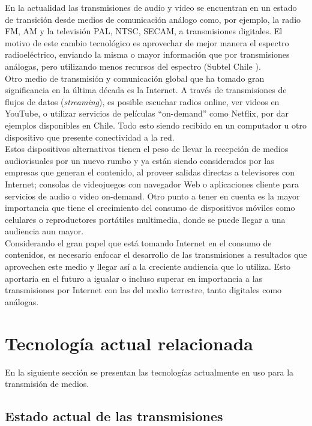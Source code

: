 En la actualidad las transmisiones de audio y video se encuentran en un estado de transición desde medios de comunicación análogo como, por ejemplo, la radio FM, AM y la televisión PAL, NTSC, SECAM, a transmisiones digitales. El motivo de este cambio tecnológico es aprovechar de mejor manera el espectro radioeléctrico, enviando la misma o mayor información que por transmisiones análogas, pero utilizando menos recursos del espectro (Subtel Chile \cite{sota:subtel}).\\

Otro medio de transmisión y comunicación global que ha tomado gran significancia en la última década es la Internet. A través de transmisiones de flujos de datos (\textit{streaming}), es posible escuchar radios online, ver videos en YouTube, o utilizar servicios de películas “on-demand” como Netflix, por dar ejemplos disponibles en Chile. Todo esto siendo recibido en un computador u otro dispositivo que presente conectividad a la red.\\

Estos dispositivos alternativos tienen el peso de llevar la recepción de medios audiovisuales por un nuevo rumbo y ya están siendo considerados por las empresas que generan el contenido, al proveer salidas directas a televisores con Internet; consolas de videojuegos con navegador Web o aplicaciones cliente para servicios de audio o video on-demand. Otro punto a tener en cuenta es la mayor importancia que tiene el crecimiento del consumo de dispositivos móviles como celulares o reproductores portátiles multimedia, donde se puede llegar a una audiencia aun mayor.\\

Considerando el gran papel que está tomando Internet en el consumo de contenidos, es necesario enfocar el desarrollo de las transmisiones a resultados que aprovechen este medio y llegar así a la creciente audiencia que lo utiliza. 
Esto aportaría en el futuro a igualar o incluso superar en importancia a las transmisiones por Internet con las del medio terrestre, tanto digitales como análogas.

\clearpage
\section{Tecnología actual relacionada}
En la siguiente sección se presentan las tecnologías actualmente en uso para la transmisión de medios.

\subsection{Estado actual de las transmisiones}

